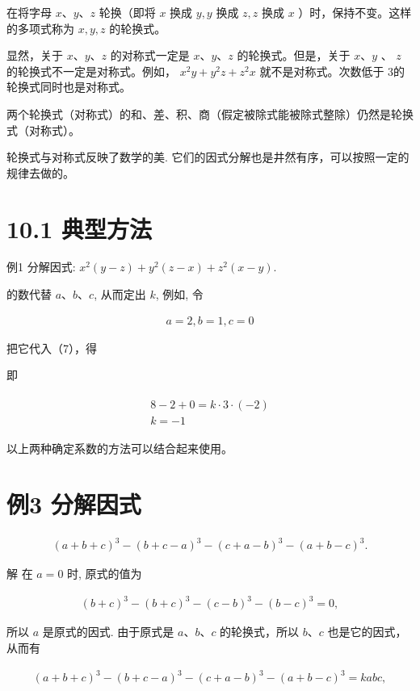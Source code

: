 \documentclass[10pt]{article}
\begin{document}
在将字母 $x 、 y 、 z$ 轮换（即将 $x$ 换成 $y, y$ 换成 $z, z$ 换成 $x$ ）时，保持不变。这样的多项式称为 $x, y, z$ 的轮换式。

显然，关于 $x 、 y 、 z$ 的对称式一定是 $x 、 y 、 z$ 的轮换式。但是，关于 $x 、 y$ 、 $z$ 的轮换式不一定是对称式。例如， $x^{2} y+y^{2} z+z^{2} x$ 就不是对称式。次数低于 3的轮换式同时也是对称式。

两个轮换式（对称式）的和、差、积、商（假定被除式能被除式整除）仍然是轮换式（对称式）。

轮换式与对称式反映了数学的美. 它们的因式分解也是井然有序，可以按照一定的规律去做的。

\section*{10.1 典型方法}
例1 分解因式: $x^{2}(y-z)+y^{2}(z-x)+z^{2}(x-y)$.

的数代替 $a 、 b 、 c$, 从而定出 $k$, 例如, 令

\begin{align*}
a=2, b=1, c=0
\end{align*}

把它代入（7），得

即

\begin{align*}
\begin{gathered}
8-2+0=k \cdot 3 \cdot(-2) \\
k=-1
\end{gathered}
\end{align*}

以上两种确定系数的方法可以结合起来使用。

\section*{例3 分解因式}
\begin{align*}
(a+b+c)^{3}-(b+c-a)^{3}-(c+a-b)^{3}-(a+b-c)^{3} .
\end{align*}

解 在 $a=0$ 时, 原式的值为

\begin{align*}
(b+c)^{3}-(b+c)^{3}-(c-b)^{3}-(b-c)^{3}=0,
\end{align*}

所以 $a$ 是原式的因式. 由于原式是 $a 、 b 、 c$ 的轮换式，所以 $b 、 c$ 也是它的因式，从而有

\begin{align*}
(a+b+c)^{3}-(b+c-a)^{3}-(c+a-b)^{3}-(a+b-c)^{3}=k a b c, \tag{8}
\end{align*}
\end{document}
